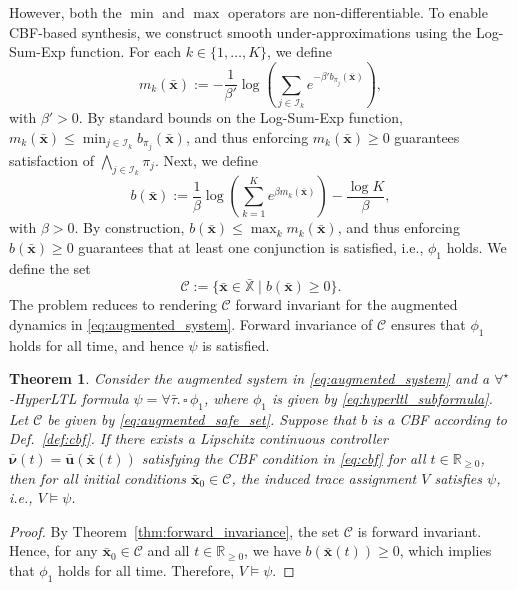 \documentclass[letterpaper, 10 pt, conference]{ieeeconf}  %
\newtheorem{theorem}{Theorem}
\begin{document}
However, both the $\min$ and $\max$ operators are non-differentiable. To enable CBF-based synthesis, we construct smooth under-approximations using the Log-Sum-Exp function. For each $k \in \{1, \dots, K\}$, we define
\begin{equation} \label{eq:smooth_min}
    m_k(\bar{\mathbf{x}}) := -\frac{1}{\beta'} \log \left( \sum_{j \in \mathcal{I}_k} e^{-\beta' b_{\pi_j}(\bar{\mathbf{x}})} \right),
\end{equation}
with $\beta' > 0$. By standard bounds on the Log-Sum-Exp function, $m_k(\bar{\mathbf{x}}) \le \min_{j \in \mathcal{I}_k} b_{\pi_j}(\bar{\mathbf{x}})$, and thus enforcing $m_k(\bar{\mathbf{x}}) \ge 0$ guarantees satisfaction of $\bigwedge_{j \in \mathcal{I}_k} \pi_j$. Next, we define
\begin{equation} \label{eq:smooth_max}
    b(\bar{\mathbf{x}}) := \frac{1}{\beta} \log \left( \sum_{k=1}^K e^{\beta m_k(\bar{\mathbf{x}})} \right) - \frac{\log K}{\beta},
\end{equation}
with $\beta > 0$. By construction, $b(\bar{\mathbf{x}}) \le \max_k m_k(\bar{\mathbf{x}})$, and thus enforcing $b(\bar{\mathbf{x}}) \ge 0$ guarantees that at least one conjunction is satisfied, i.e., $\phi_1$ holds. We define the set
\begin{equation} \label{eq:augmented_safe_set}
    \mathcal{C} := \big\{ \bar{\mathbf{x}} \in \bar{\mathbb{X}} \mid b(\bar{\mathbf{x}}) \ge 0 \big\}. 
\end{equation}
The problem reduces to rendering $\mathcal{C}$ forward invariant for the augmented dynamics in \eqref{eq:augmented_system}. Forward invariance of $\mathcal{C}$ ensures that $\phi_1$ holds for all time, and hence $\psi$ is satisfied.
\begin{theorem} \label{thm:safety_hyper}
    Consider the augmented system in \eqref{eq:augmented_system} and a $\forall^\star$-HyperLTL formula $\psi = \forall \bar{\tau} . \, \square \, \phi_1$, where $\phi_1$ is given by \eqref{eq:hyperltl_subformula}. Let $\mathcal{C}$ be given by \eqref{eq:augmented_safe_set}. Suppose that $b$ is a CBF according to Def.~\ref{def:cbf}. If there exists a Lipschitz continuous controller $\bar{\boldsymbol{\nu}}(t) = \bar{\mathbf{u}}(\bar{\mathbf{x}}(t))$ satisfying the CBF condition in \eqref{eq:cbf} for all $t \in \mathbb{R}_{\ge 0}$, then for all initial conditions $\bar{\mathbf{x}}_0 \in \mathcal{C}$, the induced trace assignment $V$ satisfies $\psi$, i.e., $V \models \psi$.
\end{theorem}
\begin{proof}
    By Theorem~\ref{thm:forward_invariance}, the set $\mathcal{C}$ is forward invariant. Hence, for any $\bar{\mathbf{x}}_0 \in \mathcal{C}$ and all $t \in \mathbb{R}_{\ge 0}$, we have $b(\bar{\mathbf{x}}(t)) \ge 0$, which implies that $\phi_1$ holds for all time. Therefore, $V \models \psi$.
\end{proof}
\end{document}
